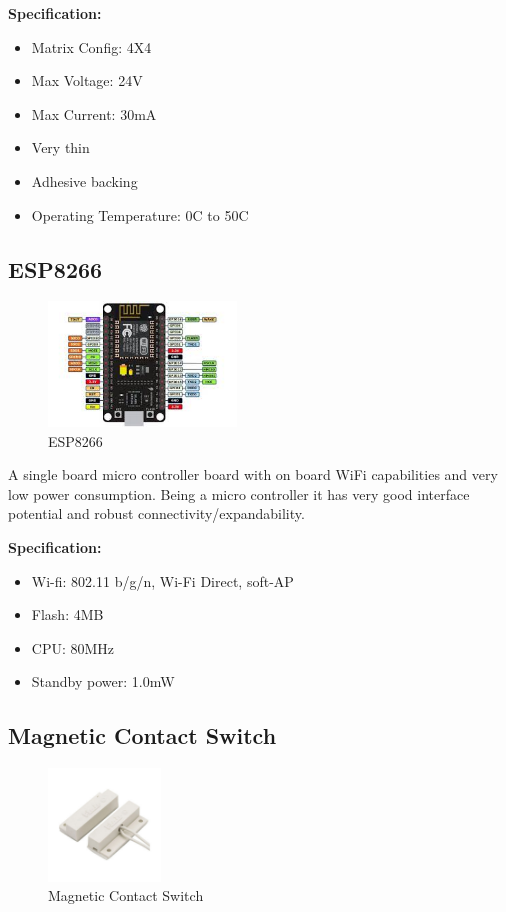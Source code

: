         \textbf{Specification: }
        \begin{itemize}
            \item Matrix Config: 4X4
            \item Max Voltage: 24V
            \item Max Current: 30mA
            \item Very thin 
            \item Adhesive backing
            \item Operating Temperature: 0C to 50C
        \end{itemize}
        
    \subsection{ESP8266}
        \begin{figure}[H]
            \centering
            \includegraphics[width=5cm]{images/esp.jpg}
            \caption{ESP8266}
        \end{figure}
        \begin{flushleft}
            A single board micro controller board with on board WiFi capabilities and very low power consumption. Being a micro controller it has
            very good interface potential and robust connectivity/expandability. 
        \end{flushleft}

        \textbf{Specification:}
            \begin{itemize}
                \item Wi-fi: 802.11 b/g/n, Wi-Fi Direct, soft-AP
                \item Flash: 4MB
                \item CPU: 80MHz
                \item Standby power: 1.0mW
            \end{itemize}

    \subsection{Magnetic Contact Switch}
        \begin{figure}[H]
            \centering
            \includegraphics[width=3cm]{images/switch.jpg}
            \caption{Magnetic Contact Switch}
        \end{figure}

